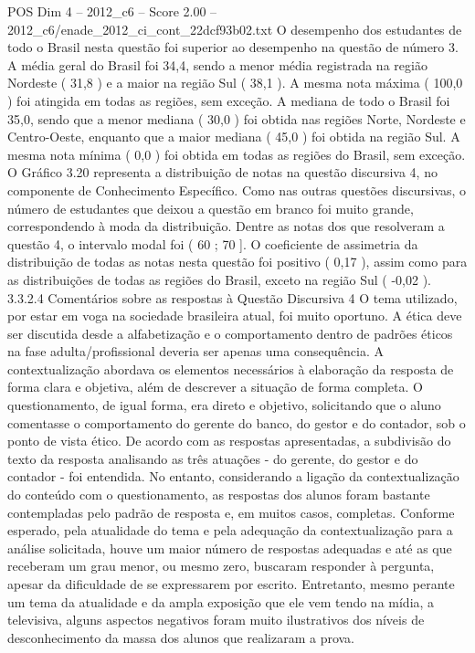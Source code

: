 \begin{textsample}{POS Dim 4 – 2012\_c6 – Score 2.00 – 2012\_c6/enade\_2012\_ci\_cont\_22dcf93b02.txt}
O desempenho dos estudantes de todo o Brasil nesta questão foi superior ao desempenho na questão de número 3.
A média geral do Brasil foi 34,4, sendo a menor média registrada na região Nordeste ( 31,8 ) e a maior na região Sul ( 38,1 ).
A mesma nota máxima ( 100,0 ) foi atingida em todas as regiões, sem exceção.
A mediana de todo o Brasil foi 35,0, sendo que a menor mediana ( 30,0 ) foi obtida nas regiões Norte, Nordeste e Centro-Oeste, enquanto que a maior mediana ( 45,0 ) foi obtida na região Sul.
A mesma nota mínima ( 0,0 ) foi obtida em todas as regiões do Brasil, sem exceção.
O Gráfico 3.20 representa a distribuição de notas na questão discursiva 4, no componente de Conhecimento Específico.
Como nas outras questões discursivas, o número de estudantes que deixou a questão em branco foi muito grande, correspondendo à moda da distribuição.
Dentre as notas dos que resolveram a questão 4, o intervalo modal foi ( 60 ; 70 ].
O coeficiente de assimetria da distribuição de todas as notas nesta questão foi positivo ( 0,17 ), assim como para as distribuições de todas as regiões do Brasil, exceto na região Sul ( -0,02 ). 3.3.2.4 Comentários sobre as respostas à Questão Discursiva 4 O tema utilizado, por estar em voga na sociedade brasileira atual, foi muito oportuno.
A ética deve ser discutida desde a alfabetização e o comportamento dentro de padrões éticos na fase adulta/profissional deveria ser apenas uma consequência.
A contextualização abordava os elementos necessários à elaboração da resposta de forma clara e objetiva, além de descrever a situação de forma completa.
O questionamento, de igual forma, era direto e objetivo, solicitando que o aluno comentasse o comportamento do gerente do banco, do gestor e do contador, sob o ponto de vista ético.
De acordo com as respostas apresentadas, a subdivisão do texto da resposta analisando as três atuações - do gerente, do gestor e do contador - foi entendida.
No entanto, considerando a ligação da contextualização do conteúdo com o questionamento, as respostas dos alunos foram bastante contempladas pelo padrão de resposta e, em muitos casos, completas.
Conforme esperado, pela atualidade do tema e pela adequação da contextualização para a análise solicitada, houve um maior número de respostas adequadas e até as que receberam um grau menor, ou mesmo zero, buscaram responder à pergunta, apesar da dificuldade de se expressarem por escrito.
Entretanto, mesmo perante um tema da atualidade e da ampla exposição que ele vem tendo na mídia, a televisiva, alguns aspectos negativos foram muito ilustrativos dos níveis de desconhecimento da massa dos alunos que realizaram a prova.

\end{textsample}
